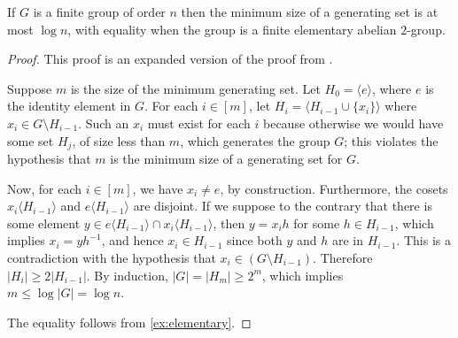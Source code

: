 \documentclass{article}
\newcommand{\todo}[1]{\textbf{TODO #1}}
\newcommand{\gen}[1]{\langle #1 \rangle}
\begin{document}
\begin{lemma}\label{lem:log}
  If $G$ is a finite group of order $n$ then the minimum size of a generating set is at most $\log n$, with equality when the group is a finite elementary abelian $2$-group.
\end{lemma}
\begin{proof}
  This proof is an expanded version of the proof from \autocite{arvind07}.

  Suppose $m$ is the size of the minimum generating set.
  Let $H_0 = \gen{e}$, where $e$ is the identity element in $G$.
  For each $i \in [m]$, let $H_i = \gen{H_{i - 1} \cup \{x_i\}}$ where $x_i \in G \setminus H_{i - 1}$.
  Such an $x_i$ must exist for each $i$ because otherwise we would have some set $H_j$, of size less than $m$, which generates the group $G$; this violates the hypothesis that $m$ is the minimum size of a generating set for $G$.

  Now, for each $i \in [m]$, we have $x_i \neq e$, by construction.
  Furthermore, the cosets $x_i \gen{H_{i - 1}}$ and $e \gen{H_{i - 1}}$ are disjoint.
  If we suppose to the contrary that there is some element $y \in e \gen{H_{i - 1}} \cap x_i \gen{H_{i - 1}}$, then $y = x_i h$ for some $h \in H_{i - 1}$, which implies $x_i = yh^{-1}$, and hence $x_i \in H_{i - 1}$ since both $y$ and $h$ are in $H_{i - 1}$.
  This is a contradiction with the hypothesis that $x_i \in (G \setminus H_{i - 1})$.
  Therefore $|H_i| \geq 2 |H_{i - 1}|$.
  By induction, $|G| = |H_m| \geq 2^m$, which implies $m \leq \log |G| = \log n$.

  The equality follows from \autoref{ex:elementary}.
\end{proof}
\end{document}
